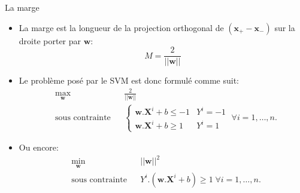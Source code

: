 \documentclass[8pt]{beamer}
\begin{document}
		\begin{frame}{La marge}
			\begin{itemize}
				\item<2-> La marge est la longueur de la projection orthogonal de $(\textbf{x}_+ - \textbf{x}_-)$ sur la droite porter par $\textbf{w}$:
					\begin{equation}
						M = \frac{2}{\vert\vert \textbf{w} \vert\vert}
					\end{equation}
				\item<2->  Le problème posé par le SVM est donc formulé comme suit:
				\begin{equation}
					\begin{aligned}
					& \max_{\textbf{w}}
					& & \frac{2}{\vert\vert \textbf{w} \vert\vert} \\
					& \text{sous contrainte}
					& & \begin{cases}
						\textbf{w}.\textbf{X}^i + b \leq -1 & Y^i = -1 \\
						\textbf{w}.\textbf{X}^i + b \geq 1 & Y^i = 1
					\end{cases} \; \forall i = 1, \dots, n.
					\end{aligned}
				\end{equation}
				\item<2->  Ou encore:
				\begin{equation}
					\begin{aligned}
					& \min_{\textbf{w}}
					& & {\vert\vert \textbf{w} \vert\vert}^2 \\
					& \text{sous contrainte}
					& & Y^i.(\textbf{w}.\textbf{X}^i + b) \geq 1 \; \forall i = 1, \dots, n.
					\end{aligned}
				\end{equation}
			\end{itemize}
		\end{frame}
\end{document}
